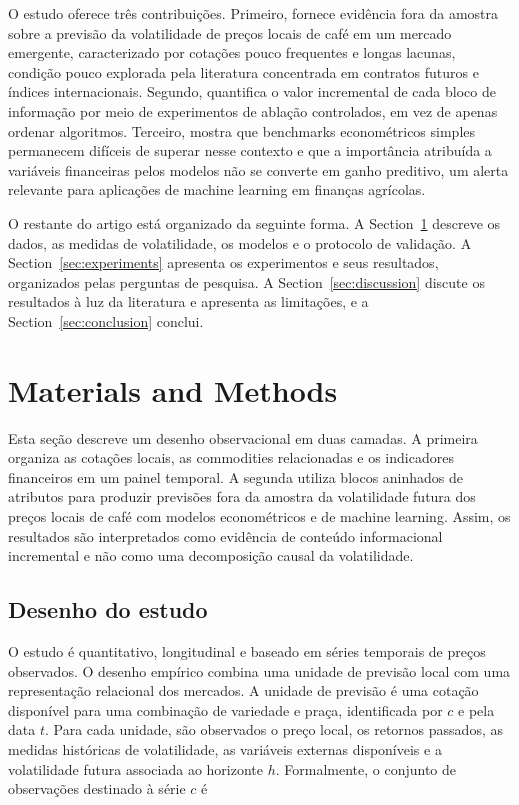\documentclass[a4paper,fleqn]{cas-sc}
\begin{document}
O estudo oferece três contribuições. Primeiro, fornece evidência fora da amostra sobre a previsão da volatilidade de preços locais de café em um mercado emergente, caracterizado por cotações pouco frequentes e longas lacunas, condição pouco explorada pela literatura concentrada em contratos futuros e índices internacionais. Segundo, quantifica o valor incremental de cada bloco de informação por meio de experimentos de ablação controlados, em vez de apenas ordenar algoritmos. Terceiro, mostra que benchmarks econométricos simples permanecem difíceis de superar nesse contexto e que a importância atribuída a variáveis financeiras pelos modelos não se converte em ganho preditivo, um alerta relevante para aplicações de machine learning em finanças agrícolas.

O restante do artigo está organizado da seguinte forma. A Section~\ref{sec:materials_methods} descreve os dados, as medidas de volatilidade, os modelos e o protocolo de validação. A Section~\ref{sec:experiments} apresenta os experimentos e seus resultados, organizados pelas perguntas de pesquisa. A Section~\ref{sec:discussion} discute os resultados à luz da literatura e apresenta as limitações, e a Section~\ref{sec:conclusion} conclui.

\section{Materials and Methods}
\label{sec:materials_methods}

Esta seção descreve um desenho observacional em duas camadas. A primeira organiza as cotações locais, as commodities relacionadas e os indicadores financeiros em um painel temporal. A segunda utiliza blocos aninhados de atributos para produzir previsões fora da amostra da volatilidade futura dos preços locais de café com modelos econométricos e de machine learning. Assim, os resultados são interpretados como evidência de conteúdo informacional incremental e não como uma decomposição causal da volatilidade.

\subsection{Desenho do estudo}
\label{subsec:study_design}

O estudo é quantitativo, longitudinal e baseado em séries temporais de preços observados. O desenho empírico combina uma unidade de previsão local com uma representação relacional dos mercados. A unidade de previsão é uma cotação disponível para uma combinação de variedade e praça, identificada por \(c\) e pela data \(t\). Para cada unidade, são observados o preço local, os retornos passados, as medidas históricas de volatilidade, as variáveis externas disponíveis e a volatilidade futura associada ao horizonte \(h\). Formalmente, o conjunto de observações destinado à série \(c\) é
\end{document}

